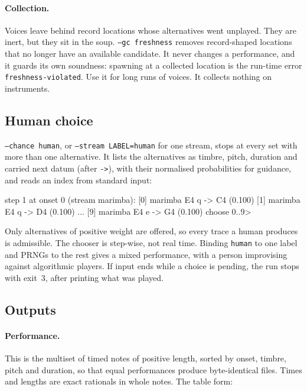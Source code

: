 \documentclass[11pt,a4paper]{article}
\newcommand{\ttx}[1]{\texttt{#1}}
\begin{document}
\paragraph{Collection.} Voices leave behind record locations whose alternatives
went unplayed. They are inert, but they sit in the soup. \ttx{--gc freshness}
removes record-shaped locations that no longer have an available candidate. It
never changes a performance, and it guards its own soundness: spawning at a
collected location is the run-time error \ttx{freshness-violated}. Use it for
long runs of voices. It collects nothing on instruments.

\subsection{Human choice}\label{ssec:human}

\ttx{--chance human}, or \ttx{--stream LABEL=human} for one stream, stops at
every set with more than one alternative. It lists the alternatives as timbre,
pitch, duration and carried next datum (after \ttx{->}), with their normalised
probabilities for guidance, and reads an index from standard input:

\begin{out}
step 1 at onset 0 (stream marimba):
  [0] marimba E4 q -> C4   (0.100)
  [1] marimba E4 q -> D4   (0.100)
  ...
  [9] marimba E4 e -> G4   (0.100)
choose 0..9>
\end{out}

\noindent Only alternatives of positive weight are offered, so every trace a
human produces is admissible. The chooser is step-wise, not real time. Binding
\ttx{human} to one label and PRNGs to the rest gives a mixed performance, with
a person improvising against algorithmic players. If input ends while a choice
is pending, the run stops with exit~3, after printing what was played.

\subsection{Outputs}

\paragraph{Performance.} This is the multiset of timed notes of positive
length, sorted by onset, timbre, pitch and duration, so that equal performances
produce byte-identical files. Times and lengths are exact rationals in whole
notes. The table form:
\end{document}
